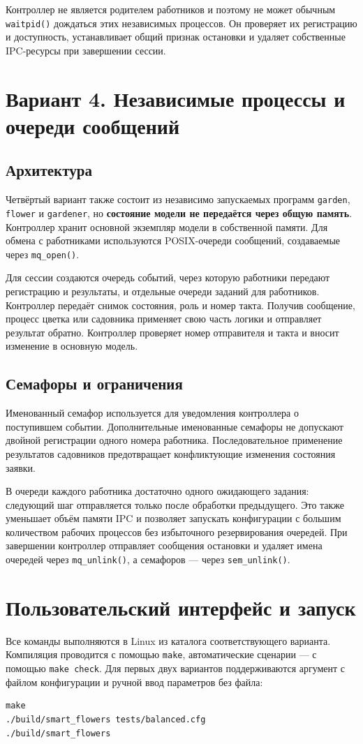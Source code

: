 \documentclass[12pt,a4paper]{article}
\begin{document}
Контроллер не является родителем работников и поэтому не может обычным \texttt{waitpid()} дождаться этих независимых процессов. Он проверяет их регистрацию и доступность, устанавливает общий признак остановки и удаляет собственные IPC-ресурсы при завершении сессии.

\section{Вариант 4. Независимые процессы и очереди сообщений}
\subsection{Архитектура}
Четвёртый вариант также состоит из независимо запускаемых программ \texttt{garden}, \texttt{flower} и \texttt{gardener}, но \textbf{состояние модели не передаётся через общую память}. Контроллер хранит основной экземпляр модели в собственной памяти. Для обмена с работниками используются POSIX-очереди сообщений, создаваемые через \texttt{mq\_open()}.

Для сессии создаются очередь событий, через которую работники передают регистрацию и результаты, и отдельные очереди заданий для работников. Контроллер передаёт снимок состояния, роль и номер такта. Получив сообщение, процесс цветка или садовника применяет свою часть логики и отправляет результат обратно. Контроллер проверяет номер отправителя и такта и вносит изменение в основную модель.

\subsection{Семафоры и ограничения}
Именованный семафор используется для уведомления контроллера о поступившем событии. Дополнительные именованные семафоры не допускают двойной регистрации одного номера работника. Последовательное применение результатов садовников предотвращает конфликтующие изменения состояния заявки.

В очереди каждого работника достаточно одного ожидающего задания: следующий шаг отправляется только после обработки предыдущего. Это также уменьшает объём памяти IPC и позволяет запускать конфигурации с большим количеством рабочих процессов без избыточного резервирования очередей. При завершении контроллер отправляет сообщения остановки и удаляет имена очередей через \texttt{mq\_unlink()}, а семафоров --- через \texttt{sem\_unlink()}.

\section{Пользовательский интерфейс и запуск}
Все команды выполняются в Linux из каталога соответствующего варианта. Компиляция проводится с помощью \texttt{make}, автоматические сценарии --- с помощью \texttt{make check}. Для первых двух вариантов поддерживаются аргумент с файлом конфигурации и ручной ввод параметров без файла:
\begin{lstlisting}
make
./build/smart_flowers tests/balanced.cfg
./build/smart_flowers
\end{lstlisting}
\end{document}
